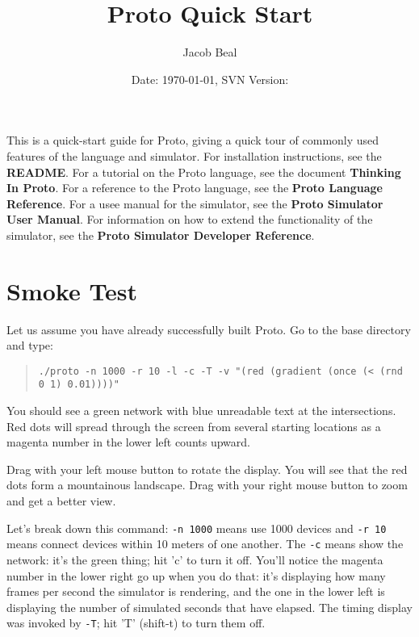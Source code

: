 \documentclass{article}
\title{Proto Quick Start}
\author{Jacob Beal}
\date{Date: \today, SVN Version: \svnrev{}}
\newcommand\code[1]{\begin{quote}\var{#1}\end{quote}}
\newcommand\var[1]{{\tt #1}}
\begin{document}
\maketitle

This is a quick-start guide for Proto, giving a quick tour of commonly
used features of the language and simulator.  For installation
instructions, see the {\bf README}.  For a tutorial
on the Proto language, see the document {\bf Thinking In Proto}.  For
a reference to the Proto language, see the {\bf Proto Language
  Reference}.  For a usee manual for the simulator, see the {\bf Proto
  Simulator User Manual}.  For information on how to extend the
functionality of the simulator, see the {\bf Proto Simulator Developer
  Reference}.



\section{Smoke Test}

Let us assume you have already successfully built Proto.
Go to the base directory and type:
\code{./proto -n 1000 -r 10 -l -c -T -v "(red (gradient (once (< (rnd
  0 1) 0.01))))"}
You should see a green network with blue unreadable text at the
intersections.  Red dots will spread through the screen from
several starting locations as a magenta number in the lower
left counts upward.

Drag with your left mouse button to rotate the display.  You will see
that the red dots form a mountainous landscape.  Drag with your right
mouse button to zoom and get a better view.

Let's break down this command: \var{-n 1000} means use 1000 devices
and \var{-r 10} means connect devices within 10 meters of one another.
The \var{-c} means show the network: it's the green thing; hit 'c' to
turn it off.  You'll notice the magenta number in the lower right go
up when you do that: it's displaying how many frames per second the
simulator is rendering, and the one in the lower left is displaying
the number of simulated seconds that have elapsed.  The timing display
was invoked by \var{-T}; hit 'T' (shift-t) to turn them off.
\end{document}
